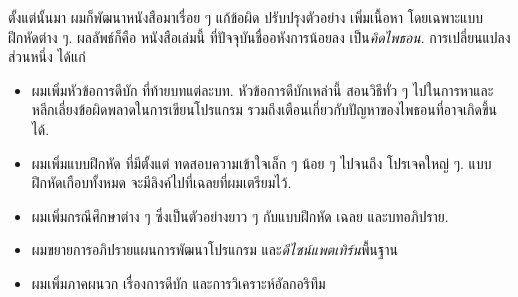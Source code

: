 
ตั้งแต่นั้นมา ผมก็พัฒนาหนังสือมาเรื่อย ๆ
แก้ข้อผิด ปรับปรุงตัวอย่าง เพิ่มเนื้อหา โดยเฉพาะแบบฝึกหัดต่าง ๆ.
%
%
ผลลัพธ์ก็คือ หนังสือเล่มนี้
ที่ปัจจุบันชื่ออหังการน้อยลง เป็น\textit{คิดไพธอน}.
การเปลี่ยนแปลงส่วนหนึ่ง ได้แก่

\begin{itemize}


\item ผมเพิ่มหัวข้อการดีบัก ที่ท้ายบทแต่ละบท.
หัวข้อการดีบักเหล่านี้ สอนวิธีทั่ว ๆ ไปในการหาและหลีกเลี่ยงข้อผิดพลาดในการเขียนโปรแกรม 
รวมถึงเตือนเกี่ยวกับปัญหาของไพธอนที่อาจเกิดขึ้นได้.


\item ผมเพิ่มแบบฝึกหัด ที่มีตั้งแต่ ทดสอบความเข้าใจเล็ก ๆ น้อย ๆ ไปจนถึง โปรเจคใหญ่ ๆ.
แบบฝึกหัดเกือบทั้งหมด จะมีลิงค์ไปที่เฉลยที่ผมเตรียมไว้.


\item ผมเพิ่มกรณีศึกษาต่าง ๆ ซึ่งเป็นตัวอย่างยาว ๆ กับแบบฝึกหัด เฉลย และบทอภิปราย.



\item ผมขยายการอภิปรายแผนการพัฒนาโปรแกรม และ\textit{ดีไซน์แพตเทิร์น}พื้นฐาน


\item ผมเพิ่มภาคผนวก เรื่องการดีบัก และการวิเคราะห์อัลกอริทึม


\end{itemize}

